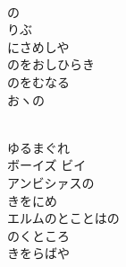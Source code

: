 \documentclass[10pt,b5j]{tarticle} %
\begin{document}
\begin{enumerate}
\begin{minipage}[c]{\blocksize}
        \vspace{\linespace}
        \item~\\
        の\\
        りぶ\\
        にさめしや\\
        のをおしひらき\\
        のをむなる\\
        おヽの
        
    \end{minipage}
    \begin{minipage}[c]{\blocksize}
        
        \vspace{\linespace}
        \item~\\
        ゆるまぐれ\\
        ボーイズ ビイ\\ アンビシァスの\\
        きをにめ\\
        エルムのとことはの\\
        のくところ\\
        きをらばや
    
    \end{minipage}
\end{enumerate} %
\end{document}
